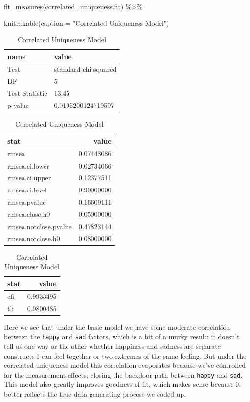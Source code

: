 \documentclass[
  letterpaper,
  DIV=11,
  numbers=noendperiod]{scrreprt}
\newenvironment{Shaded}{\begin{snugshade}}{\end{snugshade}}
\newcommand{\AttributeTok}[1]{\textcolor[rgb]{0.40,0.45,0.13}{#1}}
\newcommand{\FunctionTok}[1]{\textcolor[rgb]{0.28,0.35,0.67}{#1}}
\newcommand{\NormalTok}[1]{\textcolor[rgb]{0.00,0.23,0.31}{#1}}
\newcommand{\SpecialCharTok}[1]{\textcolor[rgb]{0.37,0.37,0.37}{#1}}
\newcommand{\StringTok}[1]{\textcolor[rgb]{0.13,0.47,0.30}{#1}}
\begin{document}
\begin{Shaded}
\begin{Highlighting}[]
\FunctionTok{fit\_measures}\NormalTok{(correlated\_uniqueness.fit) }\SpecialCharTok{\%\textgreater{}\%} 
  
\NormalTok{  knitr}\SpecialCharTok{::}\FunctionTok{kable}\NormalTok{(}\AttributeTok{caption =} \StringTok{"Correlated Uniqueness Model"}\NormalTok{)}
\end{Highlighting}
\end{Shaded}

\begin{table}
\caption{Correlated Uniqueness Model}

\centering
\begin{tabular}[t]{l|l}
\hline
name & value\\
\hline
Test & standard chi-squared\\
\hline
DF & 5\\
\hline
Test Statistic & 13.45\\
\hline
p-value & 0.0195200124719597\\
\hline
\end{tabular}
\centering
\begin{tabular}[t]{l|r}
\hline
stat & value\\
\hline
rmsea & 0.07443086\\
\hline
rmsea.ci.lower & 0.02734066\\
\hline
rmsea.ci.upper & 0.12377511\\
\hline
rmsea.ci.level & 0.90000000\\
\hline
rmsea.pvalue & 0.16609111\\
\hline
rmsea.close.h0 & 0.05000000\\
\hline
rmsea.notclose.pvalue & 0.47823144\\
\hline
rmsea.notclose.h0 & 0.08000000\\
\hline
\end{tabular}
\centering
\begin{tabular}[t]{l|r}
\hline
stat & value\\
\hline
cfi & 0.9933495\\
\hline
tli & 0.9800485\\
\hline
\end{tabular}
\end{table}

Here we see that under the basic model we have some moderate correlation
between the \texttt{happy} and \texttt{sad} factors, which is a bit of a
murky result: it doesn't tell us one way or the other whether happiness
and sadness are separate constructs I can feel together or two extremes
of the same feeling. But under the correlated uniqueness model this
correlation evaporates because we've controlled for the measurement
effects, closing the backdoor path between \texttt{happy} and
\texttt{sad}. This model also greatly improves goodness-of-fit, which
makes sense because it better reflects the true data-generating process
we coded up.
\end{document}
